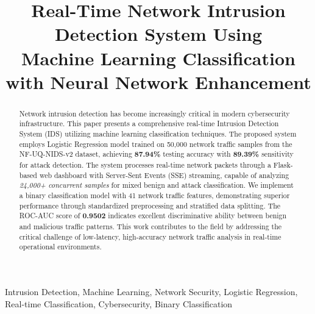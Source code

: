 \documentclass[conference]{IEEEtran}
\begin{document}
\title{Real-Time Network Intrusion Detection System Using\\
Machine Learning Classification with Neural Network Enhancement}

\author{
}

\maketitle

\begin{abstract}
Network intrusion detection has become increasingly critical in modern cybersecurity infrastructure. 
This paper presents a comprehensive real-time Intrusion Detection System (IDS) utilizing machine learning 
classification techniques. The proposed system employs Logistic Regression model trained on 50,000 network 
traffic samples from the NF-UQ-NIDS-v2 dataset, achieving \textbf{87.94\%} testing accuracy with 
\textbf{89.39\%} sensitivity for attack detection. The system processes real-time network packets through 
a Flask-based web dashboard with Server-Sent Events (SSE) streaming, capable of analyzing 
\textit{24,000+ concurrent samples} for mixed benign and attack classification. We implement a 
binary classification model with 41 network traffic features, demonstrating superior performance 
through standardized preprocessing and stratified data splitting. The ROC-AUC score of \textbf{0.9502} 
indicates excellent discriminative ability between benign and malicious traffic patterns. This work 
contributes to the field by addressing the critical challenge of low-latency, high-accuracy network 
traffic analysis in real-time operational environments.
\end{abstract}

\begin{IEEEkeywords}
Intrusion Detection, Machine Learning, Network Security, Logistic Regression, 
Real-time Classification, Cybersecurity, Binary Classification
\end{IEEEkeywords}
\end{document}
